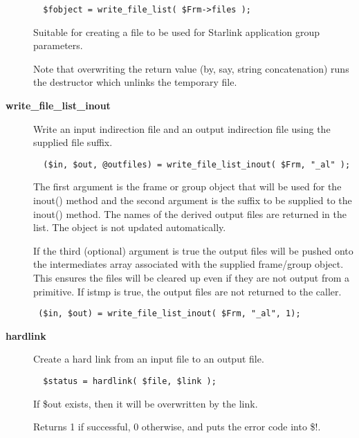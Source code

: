 \begin{description}
\begin{verbatim}
  $fobject = write_file_list( $Frm->files );
\end{verbatim}


Suitable for creating a file to be used for Starlink application
group parameters.



Note that overwriting the return value (by, say, string concatenation)
runs the destructor which unlinks the temporary file.


\item[{\textbf{write\_file\_list\_inout}}] \mbox{}

Write an input indirection file and an output indirection file using the
supplied file suffix.

\begin{verbatim}
  ($in, $out, @outfiles) = write_file_list_inout( $Frm, "_al" );
\end{verbatim}


The first argument is the frame or group object that will be used
for the inout() method and the second argument is the suffix to
be supplied to the inout() method. The names of the derived output files
are returned in the list. The object is not updated automatically.



If the third (optional) argument
is true the output files will be pushed onto the intermediates
array associated with the supplied frame/group object. This ensures
the files will be cleared up even if they are not output from a
primitive. If istmp is true, the output files are not returned to
the caller.

\begin{verbatim}
 ($in, $out) = write_file_list_inout( $Frm, "_al", 1);
\end{verbatim}

\item[{\textbf{hardlink}}] \mbox{}

Create a hard link from an input file to an output file.

\begin{verbatim}
  $status = hardlink( $file, $link );
\end{verbatim}


If \$out exists, then it will be overwritten by the link.



Returns 1 if successful, 0 otherwise, and puts the error code into \$!.

\end{description}

